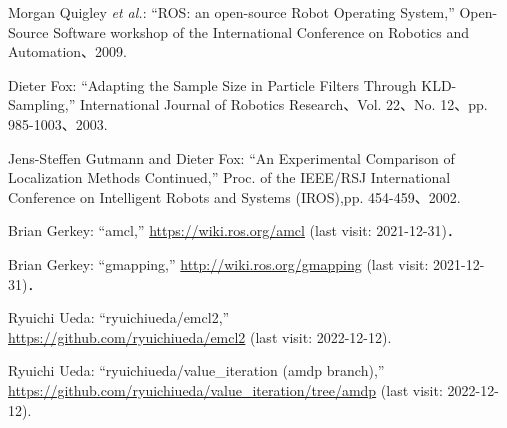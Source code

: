 \documentclass[twocolumn,9pt]{jsproceedings}
\begin{document}

\footnotesize
\begin{thebibliography}{99}
	  Morgan Quigley {\it et al.}: ``ROS: an open-source Robot Operating System,'' 
Open-Source Software workshop of the International Conference on Robotics and Automation、2009. 

Dieter Fox:
``Adapting the Sample Size in Particle Filters Through KLD-Sampling,''
International Journal of Robotics Research、Vol. 22、No. 12、pp. 985-1003、2003. 

Jens-Steffen Gutmann and Dieter Fox: 
``An Experimental Comparison of Localization Methods Continued,''
Proc. of the IEEE/RSJ International Conference on Intelligent Robots and Systems (IROS),pp. 454-459、2002.
  

  
  
  
  Brian Gerkey: ``amcl,'' \url{https://wiki.ros.org/amcl} (last visit: 2021-12-31)．

  Brian Gerkey: ``gmapping,'' \url{http://wiki.ros.org/gmapping} (last visit: 2021-12-31)．
  
  
Ryuichi Ueda: ``ryuichiueda/emcl2,''\\\url{https://github.com/ryuichiueda/emcl2} (last visit: 2022-12-12).

	Ryuichi Ueda: ``ryuichiueda/value\_iteration (amdp branch),''\\\url{https://github.com/ryuichiueda/value_iteration/tree/amdp} (last visit: 2022-12-12).


\end{thebibliography}
\end{document}
